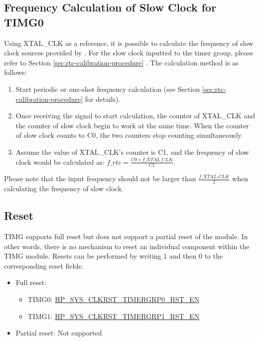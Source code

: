 \documentclass[main\_\_EN.tex]{subfiles}
\begin{document}
\subsection{Frequency Calculation of Slow Clock for TIMG0}
\label{sec:rtc-calibration-desc}

Using XTAL\_CLK as a reference, it is possible to calculate the frequency of slow clock sources provided by \chipname{}. For the slow clock inputted to the timer group, please refer to Section \ref{sec:rtc-calibration-procedure} \textit{}. The calculation method is as follows:

\begin{enumerate}
    \item Start periodic or one-shot frequency calculation (see Section \ref{sec:rtc-calibration-procedure} \textit{} for details).
    \item Once receiving the signal to start calculation, the counter of XTAL\_CLK and the counter of slow clock begin to work at the same time. When the counter of slow clock counts to C0, the two counters stop counting simultaneously.
    \item Assume the value of XTAL\_CLK's counter is C1, and the frequency of slow clock would be calculated as: $f\_rtc = \frac{C0 \times f\_XTAL\_CLK}{C1}$.
\end{enumerate}

Please note that the input frequency should not be larger than $\frac{f\_XTAL\_CLK}{2}$ when calculating the frequency of slow clock.

\subsection{Reset}

TIMG supports full reset but does not support a partial reset of the module. In other words, there is no mechanism to reset an individual component within the TIMG module. Resets can be performed by writing 1 and then 0 to the corresponding reset fields:

\begin{itemize}
    \item Full reset:
    \begin{itemize}
        \item TIMG0: \hyperref[fielddesc:HPSYSCLKRSTTIMERGRP0RSTEN]{HP\_SYS\_CLKRST\_TIMERGRP0\_RST\_EN}
        \item TIMG1: \hyperref[fielddesc:HPSYSCLKRSTTIMERGRP1RSTEN]{HP\_SYS\_CLKRST\_TIMERGRP1\_RST\_EN}
    \end{itemize}
    \item Partial reset: Not supported
\end{itemize}
\end{document}
